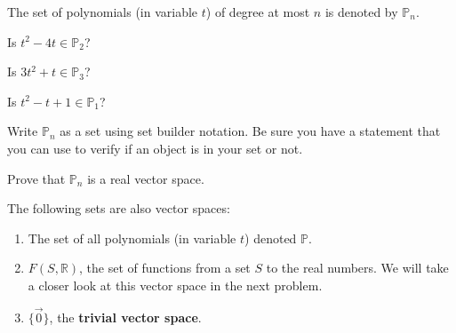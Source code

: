 \bq\label{vse} The set of polynomials (in variable $t$) of degree at most $n$ is denoted by $\mathbb{P}_n$. 
\be
\item Is $t^2-4t \in \mathbb{P}_2$?
\item Is $3t^2+t \in \mathbb{P}_3$?
\item Is $t^2-t+1 \in \mathbb{P}_1$?
\item Write $\mathbb{P}_n$ as a set using set builder notation. Be sure you have a statement that you can use to verify if an object is in your set or not.
\item Prove that $\mathbb{P}_n$ is a real vector space.
\begin{annotation}
\end{annotation}
\ee
\eq
\begin{example}
The following sets are also vector spaces:
\begin{enumerate}
\item The set of all polynomials (in variable $t$) denoted $\mathbb{P}$.
\item $F(S,\mathbb{R})$, the set of functions from a set $S$ to the real numbers. We will take a closer look at this vector space in the next problem.
\item $\{\vec{0}\}$, the \textbf{trivial vector space}.
\end{enumerate}
\end{example}


